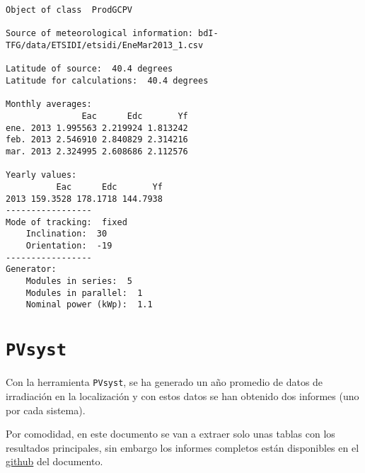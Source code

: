 \begin{verbatim}
Object of class  ProdGCPV 

Source of meteorological information: bdI-TFG/data/ETSIDI/etsidi/EneMar2013_1.csv 

Latitude of source:  40.4 degrees
Latitude for calculations:  40.4 degrees

Monthly averages:
               Eac      Edc       Yf
ene. 2013 1.995563 2.219924 1.813242
feb. 2013 2.546910 2.840829 2.314216
mar. 2013 2.324995 2.608686 2.112576

Yearly values:
          Eac      Edc       Yf
2013 159.3528 178.1718 144.7938
-----------------
Mode of tracking:  fixed 
    Inclination:  30 
    Orientation:  -19 
-----------------
Generator:
    Modules in series:  5 
    Modules in parallel:  1 
    Nominal power (kWp):  1.1
\end{verbatim}

\section{\texttt{PVsyst}}
\label{sec:org91ac4f5}
Con la herramienta \texttt{PVsyst}, se ha generado un año promedio de datos de irradiación en la localización y con estos datos se han obtenido dos informes (uno por cada sistema).

Por comodidad, en este documento se van a extraer solo unas tablas con los resultados principales, sin embargo los informes completos están disponibles en el \href{https://github.com/solarization/TFG\_Francisco\_Delgado\_Lopez}{github} del documento.

